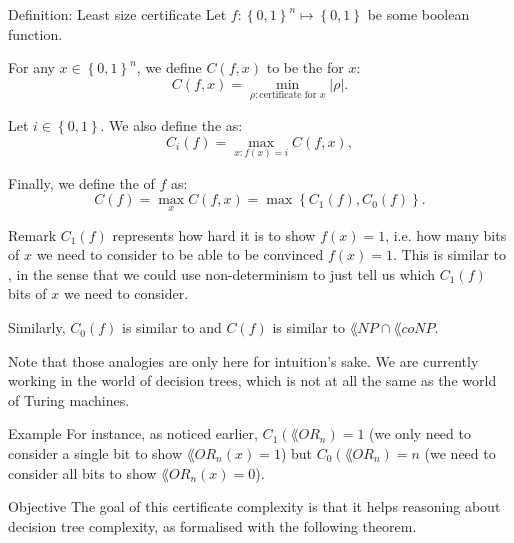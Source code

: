 \documentclass[a4paper]{article}
\begin{document}
\begin{parag}{Definition: Least size certificate}
    Let $f: \left\{0, 1\right\}^n \mapsto \left\{0, 1\right\}$ be some boolean function.

    For any $x \in \left\{0, 1\right\}^n$, we define $C\left(f, x\right)$ to be the  for $x$: 
    \[C\left(f, x\right) = \min_{\rho: \text{certificate for $x$}} \left|\rho\right|.\]
    
    Let $i \in \left\{0, 1\right\}$. We also define the  as: 
    \[C_i\left(f\right) = \max_{x: f\left(x\right) = i} C\left(f,x\right),\] 

    Finally, we define the  of $f$  as:
    \[C\left(f\right) = \max_{x} C\left(f, x\right) = \max \left\{C_1\left(f\right), C_0\left(f\right)\right\}.\]

    \begin{subparag}{Remark}
        $C_1\left(f\right)$ represents how hard it is to show $f\left(x\right) = 1$, i.e. how many bits of $x$ we need to consider to be able to be convinced $f\left(x\right) = 1$. This is similar to , in the sense that we could use non-determinism to just tell us which $C_1\left(f\right)$ bits of $x$ we need to consider.

        Similarly, $C_0\left(f\right)$ is similar to  and $C\left(f\right)$ is similar to $\lang{NP} \cap \lang{coNP}$.

        Note that those analogies are only here for intuition's sake. We are currently working in the world of decision trees, which is not at all the same as the world of Turing machines.
    \end{subparag}

    \begin{subparag}{Example}
        For instance, as noticed earlier, $C_1\left(\lang{OR}_n\right) = 1$ (we only need to consider a single bit to show $\lang{OR}_n\left(x\right) = 1$) but $C_0\left(\lang{OR}_n\right) = n$ (we need to consider all bits to show $\lang{OR}_n\left(x\right) = 0$).
    \end{subparag}

    \begin{subparag}{Objective}
        The goal of this certificate complexity is that it helps reasoning about decision tree complexity, as formalised with the following theorem.
    \end{subparag}
\end{parag}
\end{document}
